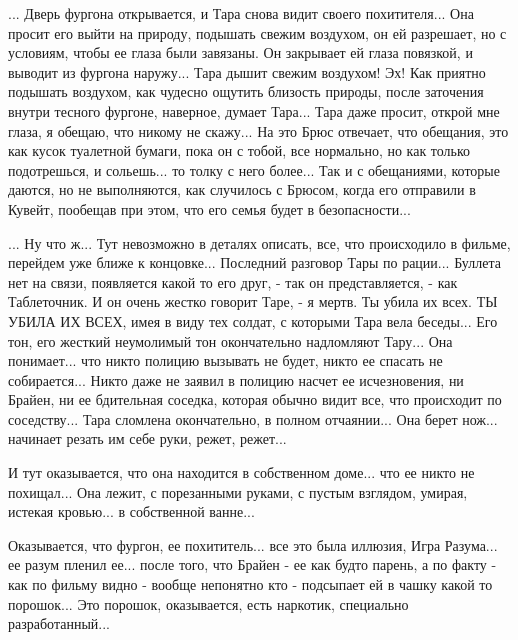 ... Дверь фургона открывается, и Тара снова видит своего похитителя... Она
просит его выйти на природу, подышать свежим воздухом, он ей разрешает, но с
условиям, чтобы ее глаза были завязаны. Он закрывает ей глаза повязкой, и
выводит из фургона наружу... Тара дышит свежим воздухом! Эх! Как приятно
подышать воздухом, как чудесно ощутить близость природы, после заточения внутри
тесного фургоне, наверное, думает Тара... Тара даже просит, открой мне глаза, я
обещаю, что никому не скажу... На это Брюс отвечает, что обещания, это как
кусок туалетной бумаги, пока он с тобой, все нормально, но как только
подотрешься, и сольешь... то толку с него более...  Так и с обещаниями, которые
даются, но не выполняются, как случилось с Брюсом, когда его отправили в
Кувейт, пообещав при этом, что его семья будет в безопасности... 

... Ну что ж... Тут невозможно в деталях описать, все, что происходило в
фильме, перейдем уже ближе к концовке...  Последний разговор Тары по рации...
Буллета нет на связи, появляется какой то его друг, - так он представляется, -
как Таблеточник. И он очень жестко говорит Таре, - я мертв. Ты убила их всех.
ТЫ УБИЛА ИХ ВСЕХ, имея в виду тех солдат, с которыми Тара вела беседы... Его
тон, его жесткий неумолимый тон окончательно надломляют Тару...  Она
понимает... что никто полицию вызывать не будет, никто ее спасать не
собирается... Никто даже не заявил в полицию насчет ее исчезновения, ни Брайен,
ни ее бдительная соседка, которая обычно видит все, что происходит по
соседству...  Тара сломлена окончательно, в полном отчаянии...  Она берет
нож... начинает резать им себе руки, режет, режет...

И тут оказывается, что она находится в собственном доме... что ее никто не
похищал...  Она лежит, с порезанными руками, с пустым взглядом, умирая, истекая
кровью... в собственной ванне... 

Оказывается, что фургон, ее похититель... все это была иллюзия, Игра Разума...
ее разум пленил ее...  после того, что Брайен - ее как будто парень, а по факту
- как по фильму видно - вообще непонятно кто - подсыпает ей в чашку какой то
порошок... Это порошок, оказывается, есть наркотик, специально разработанный...

